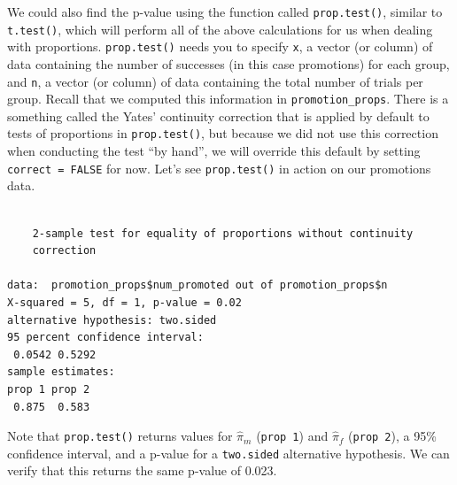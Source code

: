 \documentclass[
  letterpaper,
  DIV=11,
  numbers=noendperiod]{scrreprt}
\newenvironment{Shaded}{\begin{snugshade}}{\end{snugshade}}
\newcommand{\AttributeTok}[1]{\textcolor[rgb]{0.40,0.45,0.13}{#1}}
\newcommand{\ConstantTok}[1]{\textcolor[rgb]{0.56,0.35,0.01}{#1}}
\newcommand{\FunctionTok}[1]{\textcolor[rgb]{0.28,0.35,0.67}{#1}}
\newcommand{\NormalTok}[1]{\textcolor[rgb]{0.00,0.23,0.31}{#1}}
\newcommand{\OtherTok}[1]{\textcolor[rgb]{0.00,0.23,0.31}{#1}}
\newcommand{\SpecialCharTok}[1]{\textcolor[rgb]{0.37,0.37,0.37}{#1}}
\theoremstyle{definition}
\theoremstyle{remark}
\begin{document}
We could also find the p-value using the function called
\texttt{prop.test()}, similar to \texttt{t.test()}, which will perform
all of the above calculations for us when dealing with proportions.
\texttt{prop.test()} needs you to specify \texttt{x}, a vector (or
column) of data containing the number of successes (in this case
promotions) for each group, and \texttt{n}, a vector (or column) of data
containing the total number of trials per group. Recall that we computed
this information in \texttt{promotion\_props}. There is a something
called the Yates' continuity correction that is applied by default to
tests of proportions in \texttt{prop.test()}, but because we did not use
this correction when conducting the test ``by hand'', we will override
this default by setting \texttt{correct\ =\ FALSE} for now. Let's see
\texttt{prop.test()} in action on our promotions data.

\begin{Shaded}
\end{Shaded}

\begin{verbatim}

    2-sample test for equality of proportions without continuity
    correction

data:  promotion_props$num_promoted out of promotion_props$n
X-squared = 5, df = 1, p-value = 0.02
alternative hypothesis: two.sided
95 percent confidence interval:
 0.0542 0.5292
sample estimates:
prop 1 prop 2 
 0.875  0.583 
\end{verbatim}

Note that \texttt{prop.test()} returns values for \(\hat{\pi}_m\)
(\texttt{prop\ 1}) and \(\hat{\pi}_f\) (\texttt{prop\ 2}), a 95\%
confidence interval, and a p-value for a \texttt{two.sided} alternative
hypothesis. We can verify that this returns the same p-value of 0.023.

\begin{Shaded}
\end{Shaded}
\end{document}
